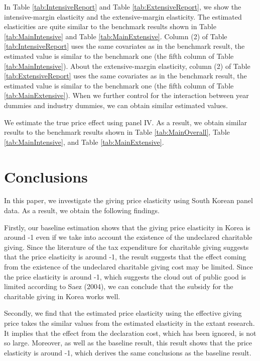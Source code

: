 \documentclass[
  11pt,
  a4paper,
]{article}
\begin{document}
In Table \ref{tab:IntensiveReport} and Table \ref{tab:ExtensiveReport},
we show the intensive-margin elasticity and the extensive-margin elasticity.
The estimated elasticities are quite similar to the benchmark results
shown in Table \ref{tab:MainIntensive} and Table \ref{tab:MainExtensive}.
Column (2) of Table \ref{tab:IntensiveReport} uses the same covariates as in the benchmark result,
the estimated value is similar to the benchmark one (the fifth column of Table \ref{tab:MainIntensive}).
About the extensive-margin elasticity,
column (2) of Table \ref{tab:ExtensiveReport} uses the same covariates as in the benchmark result,
the estimated value is similar to the benchmark one (the fifth column of Table \ref{tab:MainExtensive}).
When we further control for the interaction between year dummies and industry dummies,
we can obtain similar estimated values.

We estimate the true price effect using panel IV.
As a result, we obtain similar results to the benchmark results
shown in Table \ref{tab:MainOverall}, Table \ref{tab:MainIntensive}, and Table \ref{tab:MainExtensive}.

\hypertarget{conclusions}{%
\section{Conclusions}\label{conclusions}}

In this paper, we investigate the giving price elasticity using South Korean panel data. As a result, we obtain the following findings.

Firstly, our baseline estimation shows that the giving price elasticity in Korea is around -1 even if we take into account the existence of the undeclared charitable giving. Since the literature of the tax expenditure for charitable giving suggests that the price elasticity is around -1, the result suggests that the effect coming from the existence of the undeclared charitable giving cost may be limited. Since the price elasticity is around -1, which suggests the cloud out of public good is limited according to Saez (2004), we can conclude that the subsidy for the charitable giving in Korea works well.

Secondly, we find that the estimated price elasticity using the effective giving price takes the similar values from the estimated elasticity in the extant research. It implies that the effect from the declaration cost, which has been ignored, is not so large. Moreover, as well as the baseline result, this result shows that the price elasticity is around -1, which derives the same conclusions as the baseline result.
\end{document}
